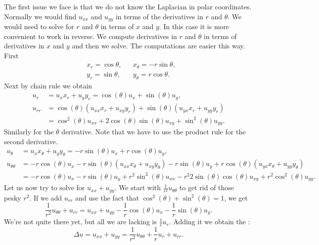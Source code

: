 The first issue we face is that we do not know the Laplacian
in polar coordinates.
Normally we would find $u_{xx}$ and $u_{yy}$ in terms of
the derivatives in $r$ and $\theta$.  We would need to solve
for $r$ and $\theta$ in terms of $x$ and $y$.  In this case
it is more convenient to work in
reverse.  We compute derivatives in $r$ and $\theta$ in terms
of derivatives in $x$ and $y$ and then we solve.  The
computations are easier this way.  First
\begin{equation*}
\begin{aligned}
& x_r = \cos \theta, & &
x_\theta = - r \sin \theta, \\
& y_r = \sin \theta, & &
y_\theta = r \cos \theta.
\end{aligned}
\end{equation*}
Next by chain rule we obtain
\begin{align*}
u_r & = u_x x_r + u_y y_r = \cos(\theta) u_x + \sin(\theta) u_y ,
\\
u_{rr} & =
\cos(\theta) ( u_{xx} x_r +u_{xy} y_r )
+ \sin(\theta) ( u_{yx} x_r +u_{yy} y_r )
\\
&
=
\cos^2(\theta) u_{xx} +
2 \cos(\theta)\sin(\theta) u_{xy} +
\sin^2(\theta) u_{yy} .
\end{align*}
Similarly for the $\theta$ derivative.  Note that we have to use
the product rule for the second derivative.
\begin{align*}
u_\theta & = u_x x_\theta + u_y y_\theta =
-r\sin(\theta) u_x + r\cos(\theta) u_y ,
\\
u_{\theta\theta} & =
-r\cos(\theta) u_x
-r\sin(\theta) (u_{xx} x_\theta + u_{xy} y_\theta)
-r\sin(\theta) u_y
+
r\cos(\theta) (u_{yx} x_\theta + u_{yy} y_\theta)
\\
& = 
-r\cos(\theta) u_x
-r\sin(\theta) u_y
+r^2 \sin^2(\theta) u_{xx}
-r^2 2\sin(\theta)\cos(\theta) u_{xy}
+r^2 \cos^2(\theta) u_{yy} .
\end{align*}
Let us now try to solve for $u_{xx} + u_{yy}$.  We start with
$\frac{1}{r^2} u_{\theta\theta}$ to get rid of those pesky $r^2$.
If we add $u_{rr}$
and use the fact that $\cos^2(\theta) +\sin^2(\theta) = 1$, we get
\begin{equation*}
\frac{1}{r^2} u_{\theta\theta}
+
u_{rr}
=
u_{xx} + u_{yy} - \frac{1}{r} \cos(\theta) u_x - \frac{1}{r} \sin(\theta)
u_y .
\end{equation*}
We're not quite there yet, but all we are lacking is 
$\frac{1}{r} u_r$.  Adding it we obtain the
\emph{}:
\begin{equation*}
\boxed{~~
\Delta u 
=
u_{xx} + u_{yy} =
\frac{1}{r^2} u_{\theta\theta}
+
\frac{1}{r} u_{r}
+
u_{rr} .
~~}
\end{equation*}

